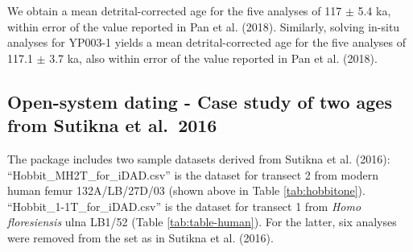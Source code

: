 \documentclass[]{elsarticle} %
\begin{document}
We obtain a mean detrital-corrected age for the five analyses of 117 \(\pm\) 5.4 ka, within error of the value reported in Pan et al. (2018).
Similarly, solving in-situ analyses for YP003-1 yields a mean detrital-corrected age for the five analyses of 117.1 \(\pm\) 3.7 ka, also within error of the value reported in Pan et al. (2018).

\hypertarget{open-system-dating---case-study-of-two-ages-from-sutikna-et-al.-2016}{%
\subsection{Open-system dating - Case study of two ages from Sutikna et al.~2016}\label{open-system-dating---case-study-of-two-ages-from-sutikna-et-al.-2016}}

The package includes two sample datasets derived from Sutikna et al. (2016): ``Hobbit\_MH2T\_for\_iDAD.csv'' is the dataset for transect 2 from modern human femur 132A/LB/27D/03 (shown above in Table \ref{tab:hobbitone}). ``Hobbit\_1-1T\_for\_iDAD.csv'' is the dataset for transect 1 from \emph{Homo floresiensis} ulna LB1/52 (Table \ref{tab:table-human}). For the latter, six analyses were removed from the set as in Sutikna et al. (2016).
\end{document}
